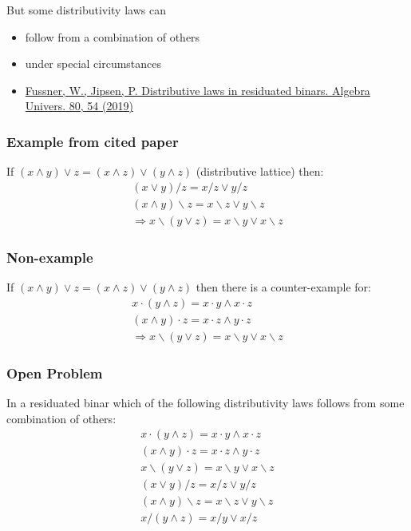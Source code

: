\documentclass{beamer}
\begin{document}
\begin{frame}
But some distributivity laws can
\begin{itemize}  
\item follow from a combination of others
\item under special circumstances
\item \href{https://doi.org/10.1007/s00012-019-0625-1}{Fussner, W., Jipsen, P. Distributive laws in residuated binars. Algebra Univers. 80, 54 (2019)}
\end{itemize}
\end{frame}
\begin{frame}
\frametitle{Example from cited paper}
If $(x\wedge y)\vee z = (x\wedge z)\vee (y\wedge z)$ (distributive lattice) then:
\begin{align*}
(x\vee y)/ z = x/ z\vee y/ z \\
(x\wedge y)\backslash z = x\backslash z\vee y\backslash z \\
\Longrightarrow x\backslash (y\vee z) = x\backslash y\vee x\backslash z
\end{align*}
\end{frame}
\begin{frame}
\frametitle{Non-example}
If $(x\wedge y)\vee z = (x\wedge z)\vee (y\wedge z)$ then there is a counter-example for:
\begin{align*}
x\cdot(y\wedge z)= x\cdot y\wedge x\cdot z \\
(x\wedge y)\cdot z= x\cdot z\wedge y\cdot z \\
\Longrightarrow x\backslash (y\vee z) = x\backslash y\vee x\backslash z
\end{align*}
\end{frame}
\begin{frame}
\frametitle{Open Problem}
In a residuated binar which of the following distributivity laws follows from some combination of others:
\begin{align}
\label{eqn:1}  
x\cdot(y\wedge z)= x\cdot y\wedge x\cdot z \\
\label{eqn:2}  
(x\wedge y)\cdot z= x\cdot z\wedge y\cdot z \\
\label{eqn:3}  
x\backslash (y\vee z) = x\backslash y\vee x\backslash z \\
\label{eqn:4}  
(x\vee y)/ z = x/ z\vee y/ z \\
\label{eqn:5}  
(x\wedge y)\backslash z = x\backslash z\vee y\backslash z \\
\label{eqn:6}  
x/ (y\wedge z) = x/ y \vee x/ z
\end{align}
\end{frame}
\end{document}
